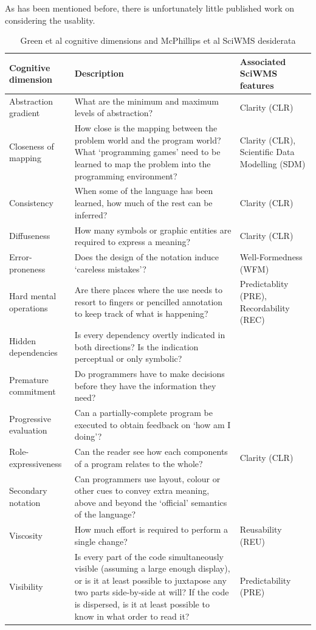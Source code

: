 \documentclass[a4paper,10pt]{scrreprt} \usepackage[utf8]{inputenc}
\begin{document}
As has been mentioned before, there is unfortunately little published work on considering the usablity.
\begin{table}[h!]
\begin{adjustwidth}{-1in}{-1in}%
\begin{tabular}{|l|p{8cm}|p{6cm}|}
\hline \textbf{Cognitive dimension}  & \textbf{Description} & \textbf{Associated SciWMS features} \\ 
\hline Abstraction gradient & What are the minimum and maximum levels of abstraction? & Clarity (CLR)  \\ 
\hline Closeness of mapping & How close is the mapping between the problem world and the program world? What `programming games' need to be learned to map the problem into the programming environment? & Clarity (CLR), Scientific Data Modelling (SDM) \\ 
\hline Consistency & When some of the language has been learned, how much of the rest can be inferred? & Clarity (CLR) \\ 
\hline Diffuseness & How many symbols or graphic entities are required to express a meaning? & Clarity (CLR) \\ 
\hline Error-proneness & Does the design of the notation induce `careless mistakes'? & Well-Formedness (WFM) \\ 
\hline Hard mental operations & Are there places where the use needs to resort to fingers or pencilled annotation to keep track of what is happening? & Predictablity (PRE), Recordability (REC) \\ 
\hline Hidden dependencies & Is every dependency overtly indicated in both directions? Is the indication perceptual or only symbolic? &  \\ 
\hline Premature commitment & Do programmers have to make decisions before they have the information they need? & \\ 
\hline Progressive evaluation & Can a partially-complete program be executed to obtain feedback on `how am I doing'? &  \\ 
\hline Role-expressiveness & Can the reader see how each components of a program relates to the whole? & Clarity (CLR)  \\ 
\hline Secondary notation & Can programmers use layout, colour or other cues to convey extra meaning, above and beyond the `official' semantics of the language? &  \\ 
\hline Viscosity & How much effort is required to perform a single change? & Reusability (REU) \\ 
\hline Visibility & Is every part of the code simultaneously visible (assuming a large enough display), or is it at least possible to juxtapose any two parts side-by-side at will? If the code is dispersed, is it at least possible to know in what order to read it? & Predictability (PRE) \\ 
\hline 
\end{tabular} 
\end{adjustwidth}
\caption{Green et al cognitive dimensions and McPhillips et al SciWMS desiderata}
\label{tab:green_mcphillips_dimensions}
\end{table}
\end{document}
